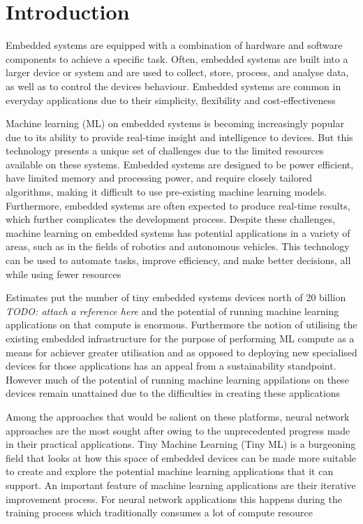\part{Introduction}

Embedded systems are equipped with a combination of hardware and software components to achieve a specific task. Often, embedded systems are built into a larger device or system and are used to collect, store, process, and analyse data, as well as to control the device\textquotesingle s behaviour. Embedded systems are common in everyday applications due to their simplicity, flexibility and cost-effectiveness

Machine learning (ML) on embedded systems is becoming increasingly popular due to its ability to provide real-time insight and intelligence to devices. But this technology presents a unique set of challenges due to the limited resources available on these systems. Embedded systems are designed to be power efficient, have limited memory and processing power, and require closely tailored algorithms, making it difficult to use pre-existing machine learning models. Furthermore, embedded systems are often expected to produce real-time results, which further complicates the development process. Despite these challenges, machine learning on embedded systems has potential applications in a variety of areas, such as in the fields of robotics and autonomous vehicles. This technology can be used to automate tasks, improve efficiency, and make better decisions, all while using fewer resources

Estimates put the number of tiny embedded systems devices north of 20 billion \textit{TODO: attach a reference here} and the potential of running machine learning applications on that compute is enormous. Furthermore the notion of utilising the existing embedded infrastructure for the purpose of performing ML compute as a means for achiever greater utilisation and as opposed to deploying new specialised devices for those applications has an appeal from a sustainability standpoint. However much of the potential of running machine learning appilations on these devices remain unattained due to the difficulties in creating these applications

Among the approaches that would be salient on these platforms, neural network approaches are the most sought after owing to the unprecedented progress made in their practical applications. Tiny Machine Learning (Tiny ML) is a burgeoning field that looks at how this space of embedded devices can be made more suitable to create and explore the potential machine learning applications that it can support. An important feature of machine learning applications are their iterative improvement process. For neural network applications this happens during the training process which traditionally consumes a lot of compute resource

